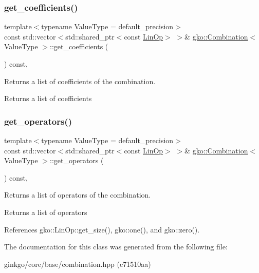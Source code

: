 \subsubsection{\texorpdfstring{get\+\_\+coefficients()}{get\_coefficients()}}
{\footnotesize\ttfamily template$<$typename Value\+Type  = default\+\_\+precision$>$ \\
const std\+::vector$<$std\+::shared\+\_\+ptr$<$const \hyperlink{classgko_1_1LinOp}{Lin\+Op}$>$ $>$\& \hyperlink{classgko_1_1Combination}{gko\+::\+Combination}$<$ Value\+Type $>$\+::get\+\_\+coefficients (\begin{DoxyParamCaption}{ }\end{DoxyParamCaption}) const\hspace{0.3cm}{\ttfamily [inline]}, {\ttfamily [noexcept]}}



Returns a list of coefficients of the combination. 

\begin{DoxyReturn}{Returns}
a list of coefficients 
\end{DoxyReturn}
\mbox{\label{classgko_1_1Combination_a75a81c2b91441ddea98949ef54f62441}} 
\subsubsection{\texorpdfstring{get\+\_\+operators()}{get\_operators()}}
{\footnotesize\ttfamily template$<$typename Value\+Type  = default\+\_\+precision$>$ \\
const std\+::vector$<$std\+::shared\+\_\+ptr$<$const \hyperlink{classgko_1_1LinOp}{Lin\+Op}$>$ $>$\& \hyperlink{classgko_1_1Combination}{gko\+::\+Combination}$<$ Value\+Type $>$\+::get\+\_\+operators (\begin{DoxyParamCaption}{ }\end{DoxyParamCaption}) const\hspace{0.3cm}{\ttfamily [inline]}, {\ttfamily [noexcept]}}



Returns a list of operators of the combination. 

\begin{DoxyReturn}{Returns}
a list of operators 
\end{DoxyReturn}


References gko\+::\+Lin\+Op\+::get\+\_\+size(), gko\+::one(), and gko\+::zero().



The documentation for this class was generated from the following file\+:\begin{DoxyCompactItemize}
\item 
ginkgo/core/base/combination.\+hpp (c71510aa)\end{DoxyCompactItemize}
